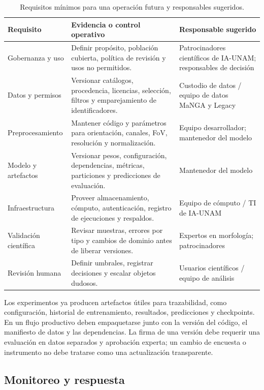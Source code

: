 \documentclass[letterpaper,11pt]{article}
\begin{document}
\begin{table}[H]
\centering
\caption{Requisitos mínimos para una operación futura y responsables sugeridos.}
\label{tab:responsables}
\begin{tabularx}{\linewidth}{>{\raggedright\arraybackslash}p{3.1cm}X>{\raggedright\arraybackslash}p{3.2cm}}
\toprule
Requisito & Evidencia o control operativo & Responsable sugerido\\
\midrule
Gobernanza y uso & Definir propósito, población cubierta, política de revisión y usos no permitidos. & Patrocinadores científicos de IA-UNAM; responsables de decisión\\
Datos y permisos & Versionar catálogos, procedencia, licencias, selección, filtros y emparejamiento de identificadores. & Custodio de datos / equipo de datos MaNGA y Legacy\\
Preprocesamiento & Mantener código y parámetros para orientación, canales, FoV, resolución y normalización. & Equipo desarrollador; mantenedor del modelo\\
Modelo y artefactos & Versionar pesos, configuración, dependencias, métricas, particiones y predicciones de evaluación. & Mantenedor del modelo\\
Infraestructura & Proveer almacenamiento, cómputo, autenticación, registro de ejecuciones y respaldos. & Equipo de cómputo / TI de IA-UNAM\\
Validación científica & Revisar muestras, errores por tipo y cambios de dominio antes de liberar versiones. & Expertos en morfología; patrocinadores\\
Revisión humana & Definir umbrales, registrar decisiones y escalar objetos dudosos. & Usuarios científicos / equipo de análisis\\
\bottomrule
\end{tabularx}
\end{table}

Los experimentos ya producen artefactos útiles para trazabilidad, como configuración, historial de entrenamiento, resultados, predicciones y checkpoints. En un flujo productivo deben empaquetarse junto con la versión del código, el manifiesto de datos y las dependencias. La firma de una versión debe requerir una evaluación en datos separados y aprobación experta; un cambio de encuesta o instrumento no debe tratarse como una actualización transparente.

\subsection{Monitoreo y respuesta}
\end{document}
